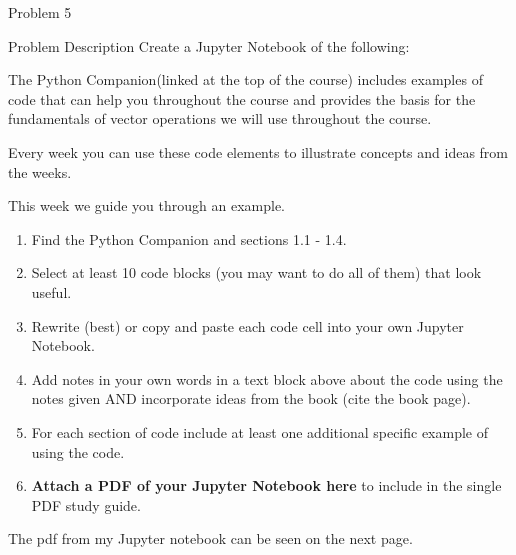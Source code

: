 \begin{problem}{Problem 5}
    \begin{statement}{Problem Description}
        Create a Jupyter Notebook of the following: \vspace*{1em}

        The Python Companion(linked at the top of the course) includes examples of  code that can help you throughout the course and provides the basis for the fundamentals of vector operations we 
        will use throughout the course. \vspace*{1em}

        Every week you can use these code elements to illustrate concepts and ideas from the weeks. \vspace*{1em}

        This week we guide you through an example.

        \begin{enumerate}
            \item Find the Python Companion and sections 1.1 - 1.4.
            \item Select at least 10 code blocks (you may want to do all of them) that look useful.
            \item Rewrite (best) or copy and paste each code cell into your own Jupyter Notebook.
            \item Add notes in your own words in a text block above about the code using the notes given AND incorporate ideas from the book (cite the book page).
            \item For each section of code include at least one additional specific example of using the code.
            \item \textbf{Attach a PDF of your Jupyter Notebook here} to include in the single PDF study guide.
        \end{enumerate}
    \end{statement}

    The pdf from my Jupyter notebook can be seen on the next page.

    \clearpage

    
\end{problem}

